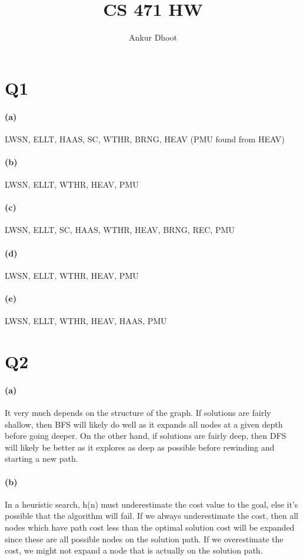\documentclass[11pt,a4paper]{article}
\begin{document}
\author{Ankur Dhoot}
\title{CS 471 HW}
\maketitle

\section*{Q1}

\paragraph*{(a)}
LWSN, ELLT, HAAS, SC, WTHR, BRNG, HEAV (PMU found from HEAV)

\paragraph*{(b)}
LWSN, ELLT, WTHR, HEAV, PMU

\paragraph*{(c)}
LWSN, ELLT, SC, HAAS, WTHR, HEAV, BRNG, REC, PMU

\paragraph*{(d)}
LWSN, ELLT, WTHR, HEAV, PMU

\paragraph*{(e)}
LWSN, ELLT, WTHR, HEAV, HAAS, PMU

\section*{Q2}
\paragraph*{(a)}
It very much depends on the structure of the graph. If solutions are fairly shallow, then BFS will likely do well as it expands all nodes at a given depth before going deeper. On the other hand, if solutions are fairly deep, then DFS will likely be better as it explores as deep as possible before rewinding and starting a new path. 

\paragraph*{(b)}
In a heuristic search, h(n) must underestimate the cost value to the goal, else it's possible that the algorithm will fail. If we always underestimate the cost, then all nodes which have path cost less than the optimal solution cost will be expanded since these are all possible nodes on the solution path. If we overestimate the cost, we might not expand a node that is actually on the solution path.
\end{document}
